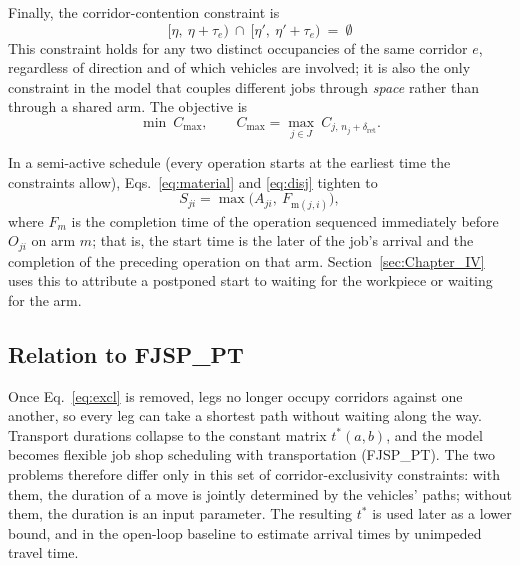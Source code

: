 \documentclass[manuscript,screen,review]{acmart}
\begin{document}
Finally, the corridor-contention constraint is
\begin{equation}
\label{eq:excl}
\bigl[\eta,\ \eta+\tau_e\bigr)\ \cap\
\bigl[\eta',\ \eta'+\tau_e\bigr)\ =\ \emptyset
\end{equation}
This constraint holds for any two distinct occupancies of the same corridor $e$, regardless of direction and of which vehicles are involved; it is also the only constraint in the model that couples different jobs through \emph{space} rather than through a shared arm. The objective is
\begin{equation}
\label{eq:obj}
\min\ C_{\max},\qquad
C_{\max}=\max_{j\in J}\ C_{j,\,n_j+\delta_{\mathrm{ret}}} .
\end{equation}

In a semi-active schedule (every operation starts at the earliest time the constraints allow), Eqs.~\eqref{eq:material} and \eqref{eq:disj} tighten to
\begin{equation}
\label{eq:bind}
S_{ji}=\max\bigl(A_{ji},\ F_{\mathrm{m}(j,i)}\bigr),
\end{equation}
where $F_m$ is the completion time of the operation sequenced immediately before $O_{ji}$ on arm $m$; that is, the start time is the later of the job's arrival and the completion of the preceding operation on that arm. Section~\ref{sec:Chapter_IV} uses this to attribute a postponed start to waiting for the workpiece or waiting for the arm.

\subsection{Relation to FJSP\_PT}
\label{sec:fjsppt}

Once Eq.~\eqref{eq:excl} is removed, legs no longer occupy corridors against one another, so every leg can take a shortest path without waiting along the way. Transport durations collapse to the constant matrix $t^{*}(a,b)$,
and the model becomes flexible job shop scheduling with transportation (FJSP\_PT). The two problems therefore differ only in this set of corridor-exclusivity constraints: with them, the duration of a move is jointly determined by the vehicles' paths; without them, the duration is an input parameter.
The resulting $t^{*}$ is used later as a lower bound, and in the open-loop baseline to estimate arrival times by unimpeded travel time.
\end{document}

